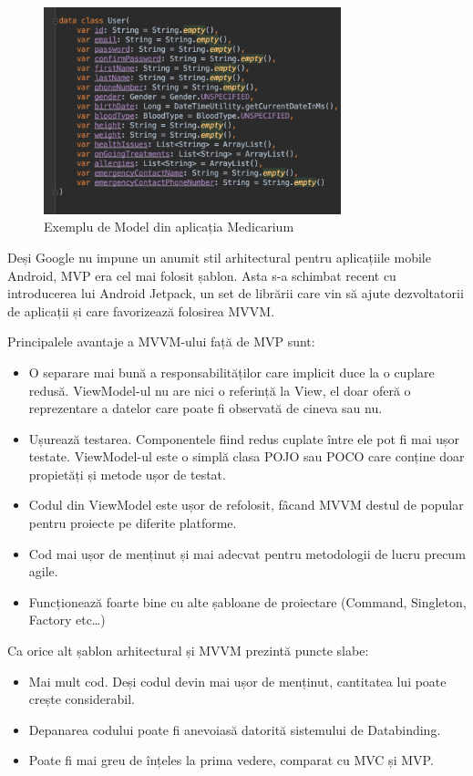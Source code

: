 \documentclass[12pt]{article}
\begin{document}
\begin{enumerate}
    \begin{figure}[H]
        \centering
        \includegraphics[height=6cm]{model.png}
        \caption{Exemplu de Model din aplicația Medicarium}
        \end{figure}

\end{enumerate}

Deși Google nu impune un anumit stil arhitectural pentru aplicațiile mobile Android, MVP
era cel mai folosit șablon. Asta s-a schimbat recent cu introducerea lui Android
Jetpack, un set de librării care vin să ajute dezvoltatorii de aplicații și care
favorizează folosirea MVVM.

Principalele avantaje a MVVM-ului față de MVP sunt:
\begin{itemize}
    \item O separare mai bună a responsabilităților care implicit duce la o cuplare
    redusă. ViewModel-ul nu are nici o referință la View, el doar oferă o reprezentare
    a datelor care poate fi observată de cineva sau nu.
    \item Ușurează testarea. Componentele fiind redus cuplate între ele pot fi 
    mai ușor testate. ViewModel-ul este o simplă clasa POJO sau POCO care conține
    doar propietăți și metode ușor de testat.
    \item Codul din ViewModel este ușor de refolosit, fâcand MVVM destul de popular pentru proiecte pe diferite platforme.
    \item Cod mai ușor de menținut și mai adecvat pentru metodologii de lucru precum
    agile.
    \item Funcționează foarte bine cu alte șabloane de proiectare (Command, Singleton, 
    Factory etc\dots)

\end{itemize}

Ca orice alt șablon arhitectural și MVVM prezintă puncte slabe:
\begin{itemize}
    \item Mai mult cod. Deși codul devin mai ușor de menținut, cantitatea lui
    poate crește considerabil.
    \item Depanarea codului poate fi anevoiasă datorită sistemului de Databinding.
    \item Poate fi mai greu de înțeles la prima vedere, comparat cu MVC și MVP.
\end{itemize}
\end{document}
